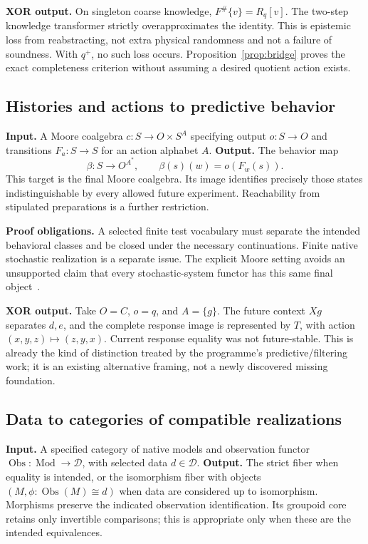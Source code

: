 \documentclass[11pt]{article}
\theoremstyle{definition}
\newcommand{\Mod}{\operatorname{Mod}}
\newcommand{\Obs}{\operatorname{Obs}}
\begin{document}
\textbf{XOR output.} On singleton coarse knowledge, $F^\#\{v\}=R_q[v]$. The two-step knowledge transformer strictly overapproximates the identity. This is epistemic loss from reabstracting, not extra physical randomness and not a failure of soundness. With $q^+$, no such loss occurs. Proposition~\ref{prop:bridge} proves the exact completeness criterion without assuming a desired quotient action exists.

\subsection{Histories and actions to predictive behavior}
\textbf{Input.} A Moore coalgebra $c:S\to O\times S^A$ specifying output $o:S\to O$ and transitions $F_a:S\to S$ for an action alphabet $A$. \textbf{Output.} The behavior map
\[
 \beta:S\longrightarrow O^{A^*},\qquad
 \beta(s)(w)=o(F_w(s)).
\]
This target is the final Moore coalgebra. Its image identifies precisely those states indistinguishable by every allowed future experiment. Reachability from stipulated preparations is a further restriction.

\textbf{Proof obligations.} A selected finite test vocabulary must separate the intended behavioral classes and be closed under the necessary continuations. Finite native stochastic realization is a separate issue. The explicit Moore setting avoids an unsupported claim that every stochastic-system functor has this same final object~\cite{Rutten}.

\textbf{XOR output.} Take $O=C$, $o=q$, and $A=\{g\}$. The future context $Xg$ separates $d,e$, and the complete response image is represented by $T$, with action $(x,y,z)\mapsto(z,y,x)$. Current response equality was not future-stable. This is already the kind of distinction treated by the programme's predictive/filtering work; it is an existing alternative framing, not a newly discovered missing foundation.

\subsection{Data to categories of compatible realizations}
\textbf{Input.} A specified category of native models and observation functor
$\Obs:\Mod\to\mathcal D$, with selected data $d\in\mathcal D$. \textbf{Output.} The strict fiber when equality is intended, or the isomorphism fiber with objects $(M,\phi:\Obs(M)\cong d)$ when data are considered up to isomorphism. Morphisms preserve the indicated observation identification. Its groupoid core retains only invertible comparisons; this is appropriate only when these are the intended equivalences.
\end{document}
